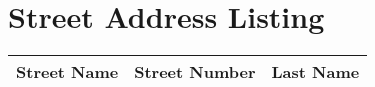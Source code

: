 \section{Street Address Listing}
\begin{longtable}{ r c l }
{\bf Street Name} & {\bf Street Number} & {\bf Last Name} \\
\midrule
\endhead

\end{longtable}


